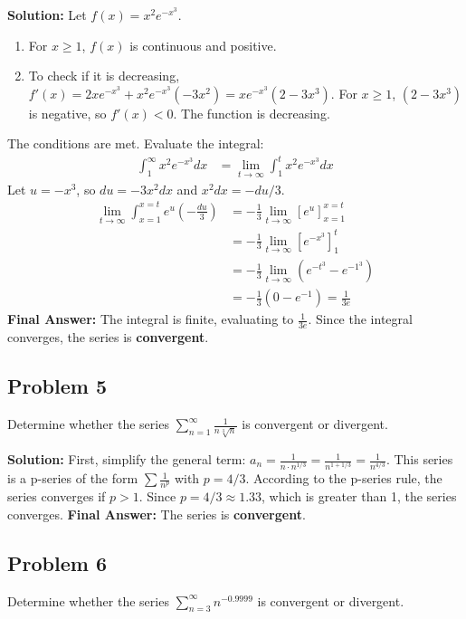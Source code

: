 \documentclass{article}
\begin{document}
\textbf{Solution:}
Let $f(x) = x^2 e^{-x^3}$.
\begin{enumerate}
    \item For $x \ge 1$, $f(x)$ is continuous and positive.
    \item To check if it is decreasing, $f'(x) = 2x e^{-x^3} + x^2 e^{-x^3}(-3x^2) = x e^{-x^3}(2-3x^3)$. For $x \ge 1$, $(2-3x^3)$ is negative, so $f'(x) < 0$. The function is decreasing.
\end{enumerate}
The conditions are met. Evaluate the integral:
\begin{align*}
    \int_1^\infty x^2 e^{-x^3} dx &= \lim_{t \to \infty} \int_1^t x^2 e^{-x^3} dx
\end{align*}
Let $u = -x^3$, so $du = -3x^2dx$ and $x^2dx = -du/3$.
\begin{align*}
    \lim_{t \to \infty} \int_{x=1}^{x=t} e^u \left(-\frac{du}{3}\right) &= -\frac{1}{3} \lim_{t \to \infty} \left[ e^u \right]_{x=1}^{x=t} \\
    &= -\frac{1}{3} \lim_{t \to \infty} \left[ e^{-x^3} \right]_1^t \\
    &= -\frac{1}{3} \lim_{t \to \infty} (e^{-t^3} - e^{-1^3}) \\
    &= -\frac{1}{3} (0 - e^{-1}) = \frac{1}{3e}
\end{align*}
\textbf{Final Answer:} The integral is finite, evaluating to $\frac{1}{3e}$. Since the integral converges, the series is \textbf{convergent}.

\subsection*{Problem 5}
Determine whether the series $\sum_{n=1}^{\infty} \frac{1}{n\sqrt[3]{n}}$ is convergent or divergent.

\textbf{Solution:}
First, simplify the general term: $a_n = \frac{1}{n \cdot n^{1/3}} = \frac{1}{n^{1+1/3}} = \frac{1}{n^{4/3}}$.
This series is a p-series of the form $\sum \frac{1}{n^p}$ with $p = 4/3$.
According to the p-series rule, the series converges if $p > 1$.
Since $p = 4/3 \approx 1.33$, which is greater than 1, the series converges.
\textbf{Final Answer:} The series is \textbf{convergent}.

\subsection*{Problem 6}
Determine whether the series $\sum_{n=3}^{\infty} n^{-0.9999}$ is convergent or divergent.
\end{document}
